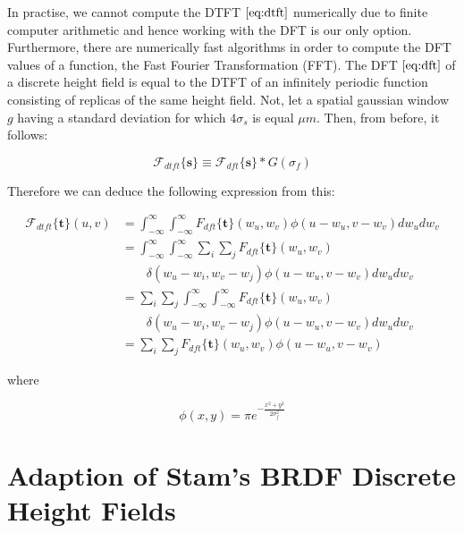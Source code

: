 In practise, we cannot compute the DTFT $\ref{eq:dtft}$ numerically due to finite computer arithmetic and hence working with the DFT is our only option. Furthermore, there are numerically fast algorithms in order to compute the DFT values of a function, the Fast Fourier Transformation (FFT). The DFT $\ref{eq:dft}$ of a discrete height field is equal to the DTFT of an infinitely periodic function consisting of replicas of the same height field. Not, let a spatial gaussian window $g$ having a standard deviation for which $4\sigma_s$ is equal $\mu m$. Then, from before, it follows:

\begin{equation}
\mathcal{F}_{dtft}\{\mathbf{s}\} \equiv \mathcal{F}_{dft} \{\mathbf{s}\} * G(\sigma_f)
\end{equation} 

Therefore we can deduce the following expression from this:

\begin{align}
\mathcal{F}_{dtft} \{\mathbf{t}\}(u,v)
& = \int_{-\infty}^{\infty} \int_{-\infty}^{\infty} {F}_{dft}\{\mathbf{t}\}(w_u,w_v) \phi(u-w_u, v-w_v) dw_u dw_v \nonumber \\
& = \int_{-\infty}^{\infty} \int_{-\infty}^{\infty} \sum_i \sum_j {F}_{dft} \{\mathbf{t}\}(w_u,w_v) \nonumber \\ 
& \quad \quad \delta(w_u-w_i, w_v-w_j)\phi(u-w_u, v-w_v) dw_u dw_v \nonumber \\
& = \sum_i \sum_j \int_{-\infty}^{\infty} \int_{-\infty}^{\infty}  {F}_{dft} \{\mathbf{t}\}(w_u,w_v) \nonumber \\
& \quad \quad \delta(w_u-w_i, w_v-w_j)\phi(u-w_u, v-w_v) dw_u dw_v \nonumber \\
& = \sum_i \sum_j {F}_{dft} \{\mathbf{t}\}(w_u,w_v) \phi(u-w_u, v-w_v)
\end{align}

where 

\begin{equation} 
 \phi(x,y) = \pi e^{-\frac{x^2 + y^2}{2\sigma_{f}^2}}
  \label{eq:gaussweight}
\end{equation} 

\section{Adaption of Stam's BRDF Discrete Height Fields}
